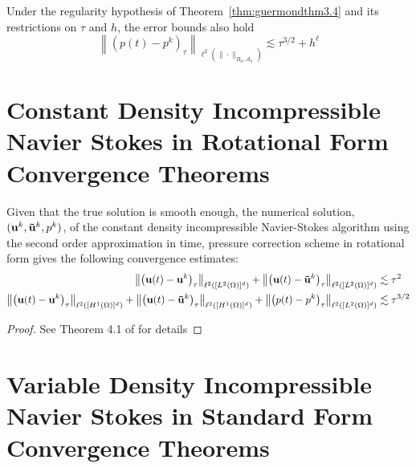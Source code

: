 \documentclass[letterpaper]{erdc}
\begin{document}
\begin{theorem}\label{thm:guermondthm3.5}
Under the regularity hypothesis of Theorem~\ref{thm:guermondthm3.4} and its restrictions on $\tau$ and $h$, the error bounds also hold
    \begin{equation}
      \left\| \left(p(t) - p^k \right)_{\tau} \right\|_{\ell^{2}\left(\|\cdot\|_{B_h, \mathcal{A}_h}\right)} \lesssim \tau^{3/2} + h^{\ell}
    \end{equation}
\end{theorem}



\section{Constant Density Incompressible Navier Stokes in Rotational Form Convergence Theorems}

\begin{theorem}
Given that the true solution is smooth enough, the numerical solution, $(\textbf{u}^k, \mathbf{\tilde{u}}^k, p^k)$, of the constant density incompressible Navier-Stokes algorithm using the second order approximation in time, pressure correction scheme in rotational form gives the following convergence estimates:
\begin{align*}
\left\| \left(\textbf{u}(t) - \textbf{u}^k\right)_{\tau} \right\|_{\ell^2\left([L^2(\Omega)]^d \right)} + \left\| \left(\textbf{u}(t) - \mathbf{\tilde{u}}^k\right)_{\tau} \right\|_{\ell^2\left([L^2(\Omega)]^d \right)} &\lesssim \tau^2\\
\left\| \left(\textbf{u}(t) - \textbf{u}^k\right)_{\tau} \right\|_{\ell^2\left([H^1(\Omega)]^d \right)} + \left\| \left(\textbf{u}(t) - \mathbf{\tilde{u}}^k\right)_{\tau} \right\|_{\ell^2\left([H^1(\Omega)]^d \right)} + \left\| \left(p(t) - p^k\right)_{\tau} \right\|_{\ell^2\left([L^2(\Omega)]^d \right)} &\lesssim \tau^{3/2}
\end{align*}

\end{theorem}
\begin{proof}
See Theorem 4.1 of \cite{guermond2004error} for details
\end{proof}


\section{Variable Density Incompressible Navier Stokes in Standard Form Convergence Theorems}
\end{document}
